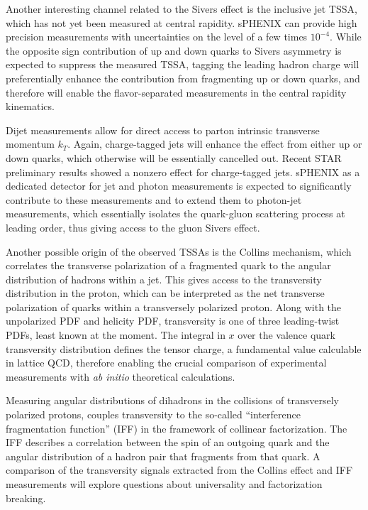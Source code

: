Another interesting channel related to the Sivers effect is the inclusive jet TSSA, which has not yet been measured at central rapidity. sPHENIX can provide high precision measurements with uncertainties on the level of a few times $10^{-4}$. While the opposite sign contribution of up and down quarks to Sivers asymmetry is expected to suppress the measured TSSA, tagging the leading hadron charge will preferentially enhance the contribution from fragmenting up or down quarks, and therefore will enable the flavor-separated measurements in the central rapidity kinematics.

Dijet measurements allow for direct access to parton intrinsic transverse momentum $k_T$. Again, charge-tagged jets will enhance the effect from either up or down quarks, which otherwise will be essentially cancelled out. Recent STAR preliminary results showed a nonzero effect for charge-tagged jets.  
sPHENIX as a dedicated detector for jet and photon measurements is expected to significantly contribute to these measurements and to extend them to photon-jet measurements, which essentially isolates the quark-gluon scattering process at leading order, thus giving access to the gluon Sivers effect.

Another possible origin of the observed TSSAs is the Collins mechanism, which correlates the transverse polarization of a fragmented quark to the angular distribution of hadrons within a jet. This gives access to the transversity distribution in the proton, which can be interpreted as the net transverse polarization of quarks within a transversely polarized proton. Along with the unpolarized PDF and helicity PDF, transversity is one of three leading-twist PDFs, least known at the moment. The integral in $x$ over the valence quark transversity distribution defines the tensor charge, a fundamental value calculable in lattice QCD, therefore enabling the crucial comparison of experimental measurements with {\it ab initio} theoretical calculations.

Measuring angular distributions of dihadrons in the collisions of
transversely polarized protons, couples transversity to the so-called
``interference fragmentation function'' (IFF) in the framework of
collinear factorization. The IFF describes a correlation between the
spin of an outgoing quark and the angular distribution of a hadron
pair that fragments from that quark.  A comparison of the transversity
signals extracted from the Collins effect and IFF measurements will
explore questions about universality and factorization breaking. 

